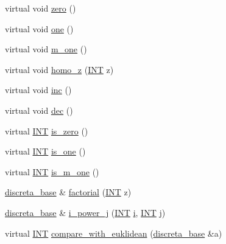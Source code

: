 \begin{DoxyCompactItemize}
virtual void \mbox{\hyperlink{classdiscreta__base_a424aa44bbb6ca48d30ad1087dbd6f210}{zero}} ()
\item 
virtual void \mbox{\hyperlink{classdiscreta__base_a6f5d6422a0040950415db30e39dafd19}{one}} ()
\item 
virtual void \mbox{\hyperlink{classdiscreta__base_a3a147eee6f3477387f7e580c117e5a05}{m\+\_\+one}} ()
\item 
virtual void \mbox{\hyperlink{classdiscreta__base_a40e349b2d85c5c6dba9c015d16a0e801}{homo\+\_\+z}} (\mbox{\hyperlink{galois_8h_a09fddde158a3a20bd2dcadb609de11dc}{I\+NT}} z)
\item 
virtual void \mbox{\hyperlink{classdiscreta__base_afda42789f4ba04ba399623a6b9e206e3}{inc}} ()
\item 
virtual void \mbox{\hyperlink{classdiscreta__base_a11449a5cfa7dc5f5600e012517af6f0f}{dec}} ()
\item 
virtual \mbox{\hyperlink{galois_8h_a09fddde158a3a20bd2dcadb609de11dc}{I\+NT}} \mbox{\hyperlink{classdiscreta__base_ac75f6bdc1ba1b406e26cf921adfd9864}{is\+\_\+zero}} ()
\item 
virtual \mbox{\hyperlink{galois_8h_a09fddde158a3a20bd2dcadb609de11dc}{I\+NT}} \mbox{\hyperlink{classdiscreta__base_a28fa37aac83194174888d34f07f43848}{is\+\_\+one}} ()
\item 
virtual \mbox{\hyperlink{galois_8h_a09fddde158a3a20bd2dcadb609de11dc}{I\+NT}} \mbox{\hyperlink{classdiscreta__base_afc2e134e55759cf069f49fcf05af418b}{is\+\_\+m\+\_\+one}} ()
\item 
\mbox{\hyperlink{classdiscreta__base}{discreta\+\_\+base}} \& \mbox{\hyperlink{classdiscreta__base_a1e817d0bf74554af67bd4df140989a7f}{factorial}} (\mbox{\hyperlink{galois_8h_a09fddde158a3a20bd2dcadb609de11dc}{I\+NT}} z)
\item 
\mbox{\hyperlink{classdiscreta__base}{discreta\+\_\+base}} \& \mbox{\hyperlink{classdiscreta__base_ae0bc8b345a8d639e626267ddbebaa7a1}{i\+\_\+power\+\_\+j}} (\mbox{\hyperlink{galois_8h_a09fddde158a3a20bd2dcadb609de11dc}{I\+NT}} \mbox{\hyperlink{alphabet2_8_c_acb559820d9ca11295b4500f179ef6392}{i}}, \mbox{\hyperlink{galois_8h_a09fddde158a3a20bd2dcadb609de11dc}{I\+NT}} \mbox{\hyperlink{alphabet2_8_c_a37d972ae0b47b9099e30983131d31916}{j}})
\item 
virtual \mbox{\hyperlink{galois_8h_a09fddde158a3a20bd2dcadb609de11dc}{I\+NT}} \mbox{\hyperlink{classdiscreta__base_a9d3091feb2fbc69359c2a45f11ceec9e}{compare\+\_\+with\+\_\+euklidean}} (\mbox{\hyperlink{classdiscreta__base}{discreta\+\_\+base}} \&a)
\item 

\end{DoxyCompactItemize}
